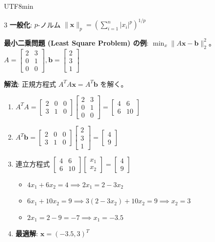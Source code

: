 \documentclass[8pt,a4paper]{article}
\begin{document}
\begin{CJK}{UTF8}{min}
\begin{multicols}{3}
\textbf{一般化}: $p$-ノルム $\|\boldsymbol{x}\|_p = \left(\sum_{i=1}^n |x_i|^p\right)^{1/p}$

\textbf{最小二乗問題 (Least Square Problem) の例}:
$\min_{x} \|A\boldsymbol{x} - \boldsymbol{b}\|_2^2$。$A = \begin{bmatrix} 2 & 3 \\ 0 & 1 \\ 0 & 0 \end{bmatrix}, \boldsymbol{b} = \begin{bmatrix} 2 \\ 3 \\ 1 \end{bmatrix}$

\textbf{解法}: 正規方程式 $A^T A \boldsymbol{x} = A^T \boldsymbol{b}$ を解く。
\begin{enumerate}
    \item $A^T A = \begin{bmatrix} 2 & 0 & 0 \\ 3 & 1 & 0 \end{bmatrix} \begin{bmatrix} 2 & 3 \\ 0 & 1 \\ 0 & 0 \end{bmatrix} = \begin{bmatrix} 4 & 6 \\ 6 & 10 \end{bmatrix}$
    \item $A^T \boldsymbol{b} = \begin{bmatrix} 2 & 0 & 0 \\ 3 & 1 & 0 \end{bmatrix} \begin{bmatrix} 2 \\ 3 \\ 1 \end{bmatrix} = \begin{bmatrix} 4 \\ 9 \end{bmatrix}$
    \item 連立方程式 $\begin{bmatrix} 4 & 6 \\ 6 & 10 \end{bmatrix} \begin{bmatrix} x_1 \\ x_2 \end{bmatrix} = \begin{bmatrix} 4 \\ 9 \end{bmatrix}$
    \begin{itemize}
        \item $4x_1 + 6x_2 = 4 \implies 2x_1 = 2 - 3x_2$
        \item $6x_1 + 10x_2 = 9 \implies 3(2-3x_2) + 10x_2 = 9 \implies x_2 = 3$
        \item $2x_1 = 2 - 9 = -7 \implies x_1 = -3.5$
    \end{itemize}
    \item \textbf{最適解}: $\boldsymbol{x} = (-3.5, 3)^T$
\end{enumerate}


\end{multicols}
\end{CJK}
\end{document}
